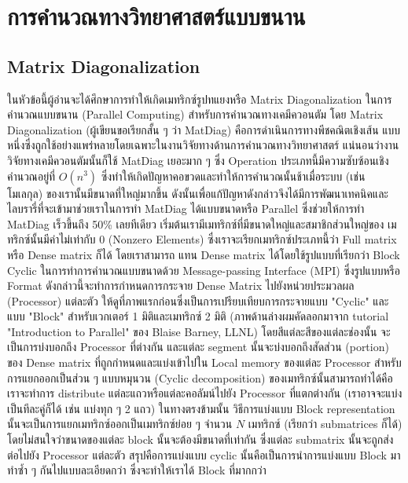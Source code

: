

\chapter{การคำนวณทางวิทยาศาสตร์แบบขนาน}
\label{ch:parallel_comp}

\section{Matrix Diagonalization}

ในหัวข้อนี้ผู้อ่านจะได้ศึกษาการทำให้เกิดเมทริกซ์รูปทแยงหรือ Matrix Diagonalization ในการคำนวณแบบขนาน (Parallel Computing) 
สำหรับการคำนวณทางเคมีควอนตัม โดย Matrix Diagonalization (ผู้เขียนขอเรียกสั้น ๆ ว่า MatDiag) คือการดำเนินการทางพีชคณิตเชิงเส้น%
แบบหนึ่งซึ่งถูกใช้อย่างแพร่หลายโดยเฉพาะในงานวิจัยทางด้านการคำนวณทางวิทยาศาสตร์ แน่นอนว่างานวิจัยทางเคมีควอนตัมนั้นก็ใช้ MatDiag 
เยอะมาก ๆ ซึ่ง Operation ประเภทนี้มีความซับซ้อนเชิงคำนวณอยู่ที่ $O(n^3)$ ซึ่งทำให้เกิดปัญหาคอขวดและทำให้การคำนวณนั้นช้าเมื่อระบบ 
(เช่น โมเลกุล) ของเรานั้นมีขนาดที่ใหญ่มากขึ้น ดังนั้นเพื่อแก้ปัญหาดังกล่าวจึงได้มีการพัฒนาเทคนิคและไลบรารี่ที่จะเข้ามาช่วยเราในการทำ MatDiag 
ได้แบบขนาดหรือ Parallel ซึ่งช่วยให้การทำ MatDiag เร็วขึ้นถึง 50\% เลยทีเดียว เริ่มต้นเรามีเมทริกซ์ที่มีขนาดใหญ่และสมาชิกส่วนใหญ่ของ%
เมทริกซ์นั้นมีค่าไม่เท่ากับ 0 (Nonzero Elements) ซึ่งเราจะเรียกเมทริกซ์ประเภทนี้ว่า Full matrix หรือ Dense matrix ก็ได้ โดยเราสามารถ%
แทน Dense matrix ได้โดยใช้รูปแบบที่เรียกว่า Block Cyclic ในการทำการคำนวณแบบขนาดด้วย Message-passing Interface (MPI) 
ซึ่งรูปแบบหรือ Format ดังกล่าวนี้จะทำการกำหนดการกระจาย Dense Matrix ไปยังหน่วยประมวลผล (Processor) แต่ละตัว 
ให้ดูที่ภาพแรกก่อนซึ่งเป็นการเปรียบเทียบการกระจายแบบ "Cyclic" และแบบ "Block" สำหรับเวกเตอร์ 1 มิติและเมทริกซ์ 2 มิติ 
(ภาพด้านล่างผมคัดลอกมาจาก tutorial "Introduction to Parallel" ของ Blaise Barney, LLNL) โดยสีแต่ละสีของแต่ละช่องนั้น%
จะเป็นการบ่งบอกถึง Processor ที่ต่างกัน และแต่ละ segment นั้นจะบ่งบอกถึงสัดส่วน (portion) ของ Dense matrix ที่ถูกกำหนดและแบ่งเข้าไปใน 
Local memory ของแต่ละ Processor สำหรับการแยกออกเป็นส่วน ๆ แบบหมุนวน (Cyclic decomposition) ของเมทริกซ์นั้นสามารถทำได้คือเราจะทำการ 
distribute แต่ละแถวหรือแต่ละคอลัมน์ไปยัง Processor ที่แตกต่างกัน (เราอาจจะแบ่งเป็นทีละคู่ก็ได้ เช่น แบ่งทุก ๆ 2 แถว)
ในทางตรงข้ามนั้น วิธีการแบ่งแบบ Block representation นั้นจะเป็นการแยกเมทริกซ์ออกเป็นเมทริกซ์ย่อย ๆ จำนวน $N$ เมทริกซ์
(เรียกว่า submatrices ก็ได้) โดยไม่สนใจว่าขนาดของแต่ละ block นั้นจะต้องมีขนาดที่เท่ากัน ซึ่งแต่ละ submatrix นั้นจะถูกส่งต่อไปยัง Processor แต่ละตัว
สรุปคือการแบ่งแบบ cyclic นั้นคือเป็นการนำการแบ่งแบบ Block มาทำซ้ำ ๆ กันไปแบบละเอียดกว่า ซึ่งจะทำให้เราได้ Block ที่มากกว่า

